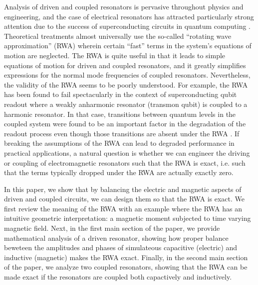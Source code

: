 
Analysis of driven and coupled resonators is pervasive throughout physics and engineering, and the case of electrical resonators has attracted particularly strong attention due to the success of superconducting circuits in quantum computing \cite{Krantz:guide2019, Blais:review2020}.
Theoretical treatments almost universally use the so-called ``rotating wave approximation'' (RWA) wherein certain ``fast'' terms in the system's equations of motion are neglected.
The RWA is quite useful in that it leads to simple equations of motion for driven and coupled resonators, and it greatly simplifies expressions for the normal mode frequencies of coupled resonators.
Nevertheless, the validity of the RWA seems to be poorly understood.
For example, the RWA has been found to fail spectacularly in the context of superconducting qubit readout where a weakly anharmonic resonator (transmon qubit) is coupled to a harmonic resonator.
In that case, transitions between quantum levels in the coupled system were found to be an important factor in the degradation of the readout process even though those transitions are absent under the RWA \cite{Sank:rotating_wave:2016}.
If breaking the assumptions of the RWA can lead to degraded performance in practical applications, a natural question is whether we can engineer the driving or coupling of electromagnetic resonators such that the RWA is exact, i.e. such that the terms typically dropped under the RWA are actually exactly zero.

In this paper, we show that by balancing the electric and magnetic aspects of driven and coupled circuits, we can design them so that the RWA is exact.
We first review the meaning of the RWA with an example where the RWA has an intuitive geometric interpretation: a magnetic moment subjected to time varying magnetic field.
Next, in the first main section of the paper, we provide mathematical analysis of a driven resonator, showing how proper balance beweteen the amplitudes and phases of simulateous capacitive (electric) and inductive (magnetic) makes the RWA exact.
Finally, in the second main section of the paper, we analyze two coupled resonators, showing that the RWA can be made exact if the resonators are coupled both capactively and inductively.
